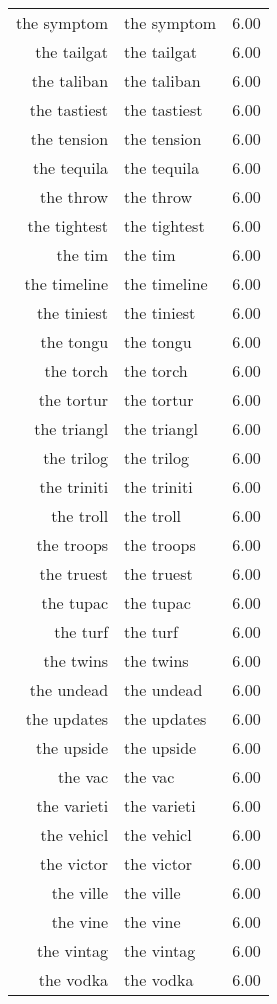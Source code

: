 \begin{table}[ht]
\begin{tabular}{rlr}
  the symptom & the symptom & 6.00 \\ 
  the tailgat & the tailgat & 6.00 \\ 
  the taliban & the taliban & 6.00 \\ 
  the tastiest & the tastiest & 6.00 \\ 
  the tension & the tension & 6.00 \\ 
  the tequila & the tequila & 6.00 \\ 
  the throw & the throw & 6.00 \\ 
  the tightest & the tightest & 6.00 \\ 
  the tim & the tim & 6.00 \\ 
  the timeline & the timeline & 6.00 \\ 
  the tiniest & the tiniest & 6.00 \\ 
  the tongu & the tongu & 6.00 \\ 
  the torch & the torch & 6.00 \\ 
  the tortur & the tortur & 6.00 \\ 
  the triangl & the triangl & 6.00 \\ 
  the trilog & the trilog & 6.00 \\ 
  the triniti & the triniti & 6.00 \\ 
  the troll & the troll & 6.00 \\ 
  the troops & the troops & 6.00 \\ 
  the truest & the truest & 6.00 \\ 
  the tupac & the tupac & 6.00 \\ 
  the turf & the turf & 6.00 \\ 
  the twins & the twins & 6.00 \\ 
  the undead & the undead & 6.00 \\ 
  the updates & the updates & 6.00 \\ 
  the upside & the upside & 6.00 \\ 
  the vac & the vac & 6.00 \\ 
  the varieti & the varieti & 6.00 \\ 
  the vehicl & the vehicl & 6.00 \\ 
  the victor & the victor & 6.00 \\ 
  the ville & the ville & 6.00 \\ 
  the vine & the vine & 6.00 \\ 
  the vintag & the vintag & 6.00 \\ 
  the vodka & the vodka & 6.00 \\ 

\end{tabular}
\end{table}

